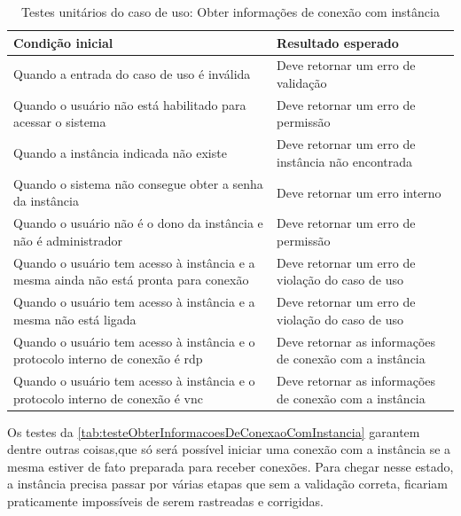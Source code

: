 \begin{table}[h]
\caption{Testes unitários do caso de uso: Obter informações de conexão com instância} 
\label{tab:testeObterInformacoesDeConexaoComInstancia}
\begin{tabularx}{\textwidth}{p{} p{}}
\toprule
\textbf{Condição inicial} & \textbf{Resultado esperado} \\ \midrule

Quando a entrada do caso de uso é inválida & Deve retornar um erro de validação \\ \hline

Quando o usuário não está habilitado para acessar o sistema & Deve retornar um erro de permissão \\ \hline

Quando a instância indicada não existe & Deve retornar um erro de instância não encontrada \\ \hline

Quando o sistema não consegue obter a senha da instância & Deve retornar um erro interno \\ \hline

Quando o usuário não é o dono da instância e não é administrador & Deve retornar um erro de permissão \\ \hline

Quando o usuário tem acesso à instância e a mesma ainda não está pronta para conexão & Deve retornar um erro de violação do caso de uso \\ \hline

Quando o usuário tem acesso à instância e a mesma não está ligada & Deve retornar um erro de violação do caso de uso \\ \hline

Quando o usuário tem acesso à instância e o protocolo interno de conexão é \gls{rdp} & Deve retornar as informações de conexão com a instância \\ \hline

Quando o usuário tem acesso à instância e o protocolo interno de conexão é \gls{vnc} & Deve retornar as informações de conexão com a instância \\

\bottomrule
\end{tabularx}
\end{table}

Os testes da \autoref{tab:testeObterInformacoesDeConexaoComInstancia} garantem dentre outras coisas,que só será possível iniciar uma conexão com a instância se a mesma estiver de fato preparada para receber conexões. Para chegar nesse estado, a instância precisa passar por várias etapas que sem a validação correta, ficariam praticamente impossíveis de serem rastreadas e corrigidas.


